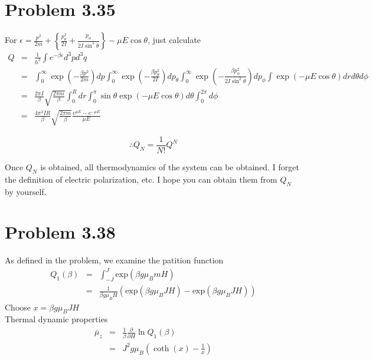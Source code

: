 \documentclass{article}
\begin{document}
\section*{Problem 3.35} %
\label{sec:problem_3_35}
	For $ \epsilon=\frac{p^2}{2m}+\left\{ \frac{p_{\theta}^2}{2I}+\frac{p_{\phi}}{2I\sin^2 \theta} \right\} - \mu E \cos \theta $, just calculate
	\begin{eqnarray*}
		Q &=&  \frac{1}{h^3} \int e^{-\beta \epsilon} d^3pd^3q\\
		&=&\int^{\infty}_0 \exp\left(- \frac{\beta p^2}{2m} \right)dp\int^{\infty}_0 \exp\left(- \frac{\beta p_{\theta}^2}{2I} \right)dp_{\theta}\int^{\infty}_0 \exp\left(- \frac{\beta p_{\phi}^2}{2I\sin^2 \theta} \right)dp_{\phi}\int\exp(- \mu E \cos \theta) drd \theta d \phi\\
		&=&\frac{2 \pi I}{\beta} \sqrt{ \frac{2 \pi m}{\beta} } \int^R_0 dr \int^{\pi}_0 \sin \theta \exp(-\mu E \cos\theta)d \theta \int^{2 \pi}_0 d \phi\\
		&=&\frac{4 \pi^2 IR}{\beta} \sqrt{ \frac{2 \pi m}{\beta} }\frac{e^{\mu E}-e^{-\mu E}}{\mu E}
	\end{eqnarray*}

	\begin{equation*}
		\therefore Q_N = \frac{1}{N!} Q^N
	\end{equation*}

	Once $Q_N$ is obtained, all thermodynamics of the system can be obtained. I forget the definition of electric polarization, etc. I hope you can obtain them from $Q_N$ by yourself.

\section*{Problem 3.38}
As defined in the problem, we examine the patition function
\begin{eqnarray*}
Q_1(\beta)&=&\int_{-J}^J\mathrm{exp}(\beta g \mu_BmH)\\
&=&\frac{1}{\beta g \mu_BH}(\mathrm{exp}(\beta g \mu_BJH)-\mathrm{exp}(\beta g \mu_B JH))
\end{eqnarray*}
Choose $x=\beta g \mu_BJH$\\
Thermal dynamic properties
\begin{eqnarray*}
\bar{\mu}_z&=&\frac{1}{\beta}\frac{\partial}{\partial H}\ln Q_1(\beta)\\
&=&J^2g\mu_B(\coth (x)-\frac{1}{x})
\end{eqnarray*}
\end{document}
